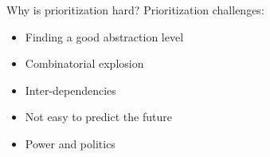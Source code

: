 \begin{Slide}{Why is prioritization hard?}
Prioritization challenges:
\begin{itemize}
\item Finding a good abstraction level
\item Combinatorial explosion
\item Inter-dependencies
\item Not easy to predict the future
\item Power and politics

\end{itemize}
\end{Slide}
